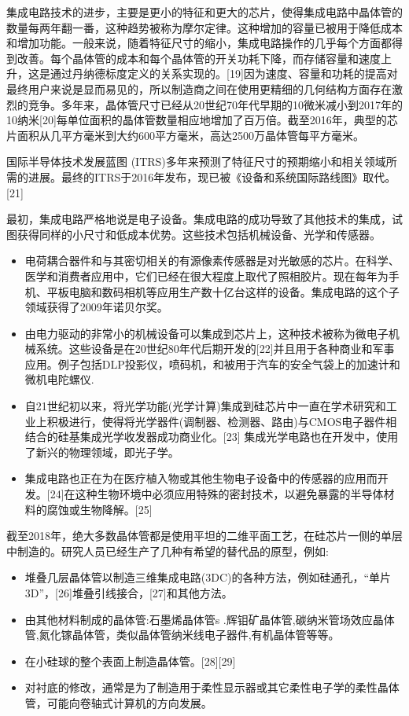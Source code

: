 集成电路技术的进步，主要是更小的特征和更大的芯片，使得集成电路中晶体管的数量每两年翻一番，这种趋势被称为摩尔定律。这种增加的容量已被用于降低成本和增加功能。一般来说，随着特征尺寸的缩小，集成电路操作的几乎每个方面都得到改善。每个晶体管的成本和每个晶体管的开关功耗下降，而存储容量和速度上升，这是通过丹纳德标度定义的关系实现的。[19]因为速度、容量和功耗的提高对最终用户来说是显而易见的，所以制造商之间在使用更精细的几何结构方面存在激烈的竞争。多年来，晶体管尺寸已经从20世纪70年代早期的10微米减小到2017年的10纳米[20]每单位面积的晶体管数量相应地增加了百万倍。截至2016年，典型的芯片面积从几平方毫米到大约600平方毫米，高达2500万晶体管每平方毫米。

国际半导体技术发展蓝图 (ITRS)多年来预测了特征尺寸的预期缩小和相关领域所需的进展。最终的ITRS于2016年发布，现已被《设备和系统国际路线图》取代。[21]

最初，集成电路严格地说是电子设备。集成电路的成功导致了其他技术的集成，试图获得同样的小尺寸和低成本优势。这些技术包括机械设备、光学和传感器。

\begin{itemize}
\item 电荷耦合器件和与其密切相关的有源像素传感器是对光敏感的芯片。在科学、医学和消费者应用中，它们已经在很大程度上取代了照相胶片。现在每年为手机、平板电脑和数码相机等应用生产数十亿台这样的设备。集成电路的这个子领域获得了2009年诺贝尔奖。
\item 由电力驱动的非常小的机械设备可以集成到芯片上，这种技术被称为微电子机械系统。这些设备是在20世纪80年代后期开发的[22]并且用于各种商业和军事应用。例子包括DLP投影仪，喷码机，和被用于汽车的安全气袋上的加速计和微机电陀螺仪.
\item 自21世纪初以来，将光学功能(光学计算)集成到硅芯片中一直在学术研究和工业上积极进行，使得将光学器件(调制器、检测器、路由)与CMOS电子器件相结合的硅基集成光学收发器成功商业化。[23] 集成光学电路也在开发中，使用了新兴的物理领域，即光子学。
\item 集成电路也正在为在医疗植入物或其他生物电子设备中的传感器的应用而开发。[24]在这种生物环境中必须应用特殊的密封技术，以避免暴露的半导体材料的腐蚀或生物降解。[25]
\end{itemize}

截至2018年，绝大多数晶体管都是使用平坦的二维平面工艺，在硅芯片一侧的单层中制造的。研究人员已经生产了几种有希望的替代品的原型，例如:

\begin{itemize}
\item 堆叠几层晶体管以制造三维集成电路(3DC)的各种方法，例如硅通孔，“单片3D”，[26]堆叠引线接合，[27]和其他方法。
\item 由其他材料制成的晶体管:石墨烯晶体管s .辉钼矿晶体管,碳纳米管场效应晶体管,氮化镓晶体管，类似晶体管纳米线电子器件,有机晶体管等等。
\item 在小硅球的整个表面上制造晶体管。[28][29]
\item 对衬底的修改，通常是为了制造用于柔性显示器或其它柔性电子学的柔性晶体管，可能向卷轴式计算机的方向发展。
\end{itemize}

